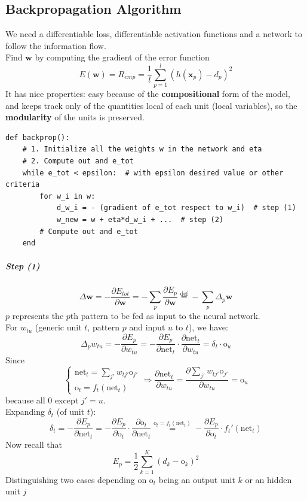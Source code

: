 \documentclass[10pt]{report}
\begin{document}
\subsection{Backpropagation Algorithm} We need a differentiable loss, differentiable activation functions and a network to follow the information flow.\\
Find $\mathbf{w}$ by computing the gradient of the error function $$E(\mathbf{w}) = R_{emp} = \frac{1}{l}\sum_{p=1}^l (h(\mathbf{x}_p) - d_p)^2$$
It has nice properties: easy because of the \textbf{compositional} form of the model, and keeps track only of the quantities local of each unit (local variables), so the \textbf{modularity} of the units is preserved.
\begin{lstlisting}[style=myPython]
def backprop():
	# 1. Initialize all the weights w in the network and eta
	# 2. Compute out and e_tot
	while e_tot < epsilon:  # with epsilon desired value or other criteria
		for w_i in w:
			d_w_i = - (gradient of e_tot respect to w_i)  # step (1)
			w_new = w + eta*d_w_i + ...  # step (2)
		# Compute out and e_tot
	end
\end{lstlisting}
\subparagraph{Step (1)} $$\Delta \mathbf{w} = - \frac{\partial E_{tot}}{\partial \mathbf{w}} = - \sum_p \frac{\partial E_p}{\partial \mathbf{w}} \overset{\text{def}}{=} -\sum_p \Delta_p \mathbf{w}$$
$p$ represents the $p$th pattern to be fed as input to the neural network.\\
For $w_{tu}$ (generic unit $t$, pattern $p$ and input $u$ to $t$), we have:
$$\Delta_p w_{tu} = -\frac{\partial E_p}{\partial w_{tu}} = -\frac{\partial E_p}{\partial\text{net}_t}\cdot\frac{\partial\text{net}_t}{\partial w_{tu}} = \delta_t \cdot \text{o}_u$$
Since 
$$\left\{\begin{array}{l}
\text{net}_t = \sum_{j'}w_{tj'}\text{o}_{j'}\\
\text{o}_t = f_t(\text{net}_t)
\end{array}\right.\Rightarrow \frac{\partial\text{net}_t}{\partial w_{tu}} = \frac{\partial \sum_{j'}w_{tj'}\text{o}_{j'}}{\partial w_{tu}} = \text{o}_u$$
because all 0 except $j'=u$.\\
Expanding $\delta_t$ (of unit $t$):
$$\delta_t=-\frac{\partial E_p}{\partial\text{net}_t}=-\frac{\partial E_p}{\partial\text{o}_t}\cdot\frac{\partial\text{o}_t}{\partial\text{net}_t} \overset{\text{o}_t=f_t(\text{net}_t)}{=}-\frac{\partial E_p}{\partial\text{o}_t}\cdot f_t'(\text{net}_t)$$
Now recall that $$E_p=\frac{1}{2}\sum_{k=1}^K(d_k-\text{o}_k)^2$$
Distinguishing two cases depending on $\text{o}_t$ being an output unit $k$ or an hidden unit $j$
\end{document}
